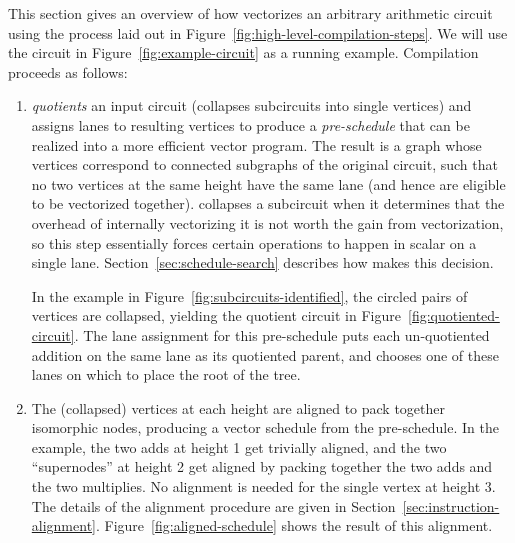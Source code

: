 This section gives an overview of how \system vectorizes an arbitrary arithmetic circuit using the process laid out in Figure~\ref{fig:high-level-compilation-steps}.
We will use the circuit in Figure~\ref{fig:example-circuit} as a running example.
Compilation proceeds as follows:
\begin{enumerate}
    \item \system \textit{quotients} an input circuit (collapses subcircuits into single vertices) and assigns lanes to resulting vertices to produce a {\em pre-schedule} that can be realized into a more efficient vector program. The result is a graph whose vertices correspond to connected subgraphs of the original circuit, such that no two vertices at the same height have the same lane (and hence are eligible to be vectorized together). \system collapses a subcircuit when it determines that the overhead of internally vectorizing it is not worth the gain from vectorization, so this step essentially forces certain operations to happen in scalar on a single lane. %
    Section~\ref{sec:schedule-search} describes how \system makes this decision. 
    
    In the example in Figure~\ref{fig:subcircuits-identified}, the circled pairs of vertices are collapsed, yielding the quotient circuit in Figure~\ref{fig:quotiented-circuit}.
    The lane assignment for this pre-schedule puts each un-quotiented addition on the same lane as its quotiented parent, and chooses one of these lanes on which to place the root of the tree.
    
    
    \item The (collapsed) vertices at each height are aligned to pack together isomorphic nodes, producing a vector schedule from the pre-schedule. 
    In the example, the two adds at height 1 get trivially aligned, and the two ``supernodes'' at height 2 get aligned by packing together the two adds and the two multiplies.
    No alignment is needed for the single vertex at height 3.
    The details of the alignment procedure are given in Section~\ref{sec:instruction-alignment}.
    Figure~\ref{fig:aligned-schedule} shows the result of this alignment.
    

\end{enumerate}
